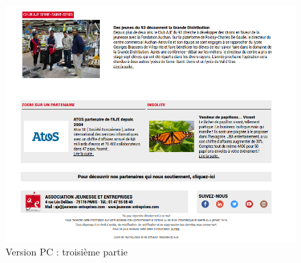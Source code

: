 \documentclass[report]{tnreport}
\begin{document}
\begin{figure}[h]
  \centering
  \includegraphics[width=13cm]{figures/aje3}
  \caption{Version PC : troisième partie}
  \label{fig:aje3}
\end{figure}
\end{document}
